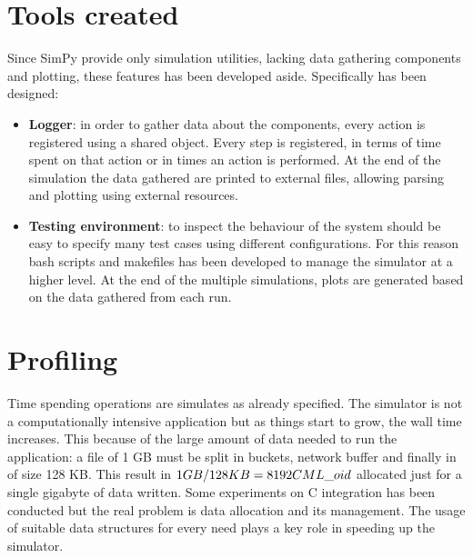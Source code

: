 \section{Tools created}
Since SimPy provide only simulation utilities, lacking data gathering components
and plotting, these features has been developed aside. Specifically has been designed:
\begin{itemize}
    \item \textbf{Logger}: in order to gather data about the components, every
        action is registered using a shared object. Every step is registered, in
        terms of time spent on that action or in times an action is performed.
        At the end of the simulation the data gathered are printed to external
        files, allowing parsing and plotting using external resources.
    \item \textbf{Testing environment}: to inspect the behaviour of the system
        should be easy to specify many test cases using different
        configurations. For this reason bash scripts and makefiles has been
        developed to manage the simulator at a higher level. At the end of the
        multiple simulations, plots are generated based on the data gathered
        from each run.
\end{itemize}

\section{Profiling}\label{profiling}
Time spending operations are simulates as already specified. The simulator is
not a computationally intensive application but as things start to grow, the
wall time increases. This because of the large amount of data needed to run the
application: a file of 1 GB must be split in buckets, network buffer and
finally in \cmloid of size 128 KB. This result in $1GB / 128KB = 8192 CML\_oid$
allocated just for a single gigabyte of data written. Some experiments on C
integration has been conducted but the real problem is data allocation and its
management. The usage of suitable data structures for every need plays a key
role in speeding up the simulator. \\

